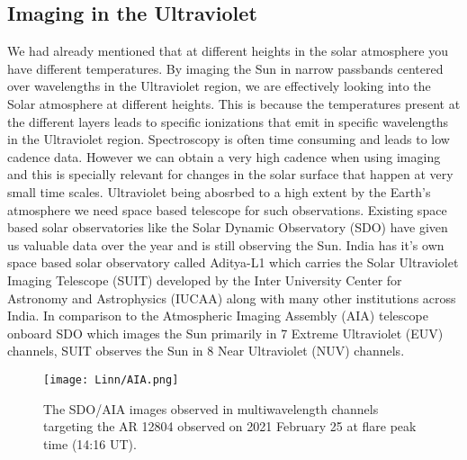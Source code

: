 \documentclass{../template/texnote}
\begin{document}
\subsection{Imaging in the Ultraviolet}

We had already mentioned that at different heights in the solar atmosphere you have different temperatures.
By imaging the Sun in narrow passbands centered over wavelengths in the Ultraviolet region, we are effectively looking into the Solar atmosphere at 
different heights.
This is because the temperatures present at the different layers leads to specific ionizations that emit in specific wavelengths in the Ultraviolet region.
Spectroscopy is often time consuming and leads to low cadence data.
However we can obtain a very high cadence when using imaging and this is specially relevant for changes in the solar surface that happen at very small time scales.
Ultraviolet being abosrbed to a high extent by the Earth's atmosphere we need space based telescope for such observations.
Existing space based solar observatories like the Solar Dynamic Observatory (SDO) have given us valuable data over the year and is still observing the Sun.
India has it's own space based solar observatory called Aditya-L1 which carries the Solar Ultraviolet Imaging Telescope (SUIT) developed by the Inter University Center for Astronomy and Astrophysics (IUCAA) along with many other institutions across India.
In comparison to the Atmospheric Imaging Assembly (AIA) telescope onboard SDO which images the Sun primarily in 7 Extreme Ultraviolet (EUV) channels, SUIT observes the Sun in 8 Near Ultraviolet (NUV) channels. 
\begin{figure}
    \centering
    \texttt{[image: Linn/AIA.png]}
    \caption{The SDO/AIA images observed in multiwavelength channels targeting the AR 12804 observed on 2021 February 25 at flare peak time (14:16 UT).} 
    \label{fig:AIA}
\end{figure}

\end{document}
